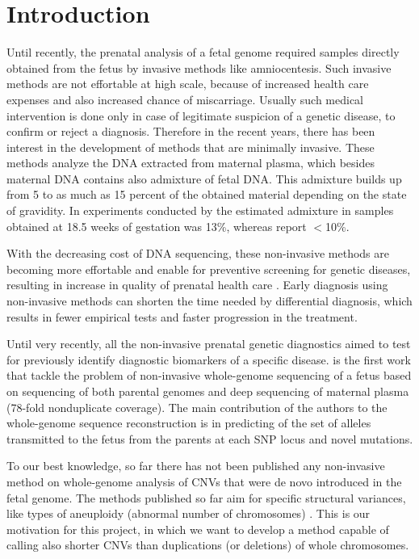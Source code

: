 \section{Introduction}

Until recently, the prenatal analysis of a fetal genome required samples directly obtained from the fetus by invasive methods like amniocentesis. Such invasive methods are not effortable at high scale, because of increased health care expenses and also increased chance of miscarriage. Usually such medical intervention is done only in case of legitimate suspicion of a genetic disease, to confirm or reject a diagnosis. Therefore in the recent years, there has been interest in the development of methods that are minimally invasive. These methods analyze the DNA extracted from maternal plasma, which besides maternal DNA contains also admixture of fetal DNA. This admixture builds up from 5 to as much as 15 percent of the obtained material depending on the state of gravidity. In experiments conducted by \cite{kitzman2012} the estimated admixture in samples obtained at 18.5 weeks of gestation was 13\%, whereas \cite{bauer2006} report $<$10\%.

With the decreasing cost of DNA sequencing, these non-invasive methods are becoming more effortable and enable for preventive screening for genetic diseases, resulting in increase in quality of prenatal health care \cite{saunders2012}. Early diagnosis using non-invasive methods can shorten the time needed by differential diagnosis, which results in fewer empirical tests and faster progression in the treatment.

Until very recently, all the non-invasive prenatal genetic diagnostics aimed to test for previously identify diagnostic biomarkers of a specific disease. \cite{kitzman2012} is the first work that tackle the problem of non-invasive whole-genome sequencing of a fetus based on sequencing of both parental genomes and deep sequencing of maternal plasma (78-fold nonduplicate coverage). The main contribution of the authors to the whole-genome sequence reconstruction is in predicting of the set of alleles transmitted to the fetus from the parents at each SNP locus and novel mutations. 

To our best knowledge, so far there has not been published any non-invasive method on whole-genome analysis of CNVs that were de novo introduced in the fetal genome. The methods published so far aim for specific structural variances, like types of aneuploidy (abnormal number of chromosomes) \cite{chu2009}. This is our motivation for this project, in which we want to develop a method capable of calling also shorter CNVs than duplications (or deletions) of whole chromosomes.

